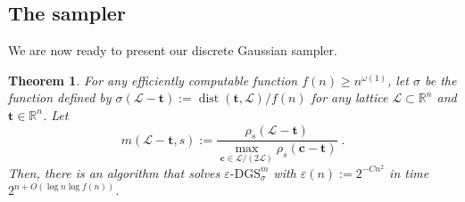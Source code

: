 \documentclass[11pt]{article}
\newtheorem{theorem}{Theorem}[section]
\newcommand{\R}{\ensuremath{\mathbb{R}}}
\newcommand{\eps}{\varepsilon}
\renewcommand{\vec}[1]{\ensuremath{\mathbf{#1}}}
\newcommand{\problem}[1]{\mbox{#1}\xspace}
\newcommand{\DGS}[3]{\ensuremath{#1\text{-}\problem{DGS}_{#2}^{#3}}}
\newcommand{\lat}{\mathcal{L}}
\DeclareMathOperator{\dist}{dist}
\begin{document}
\subsection{The sampler}
We are now ready to present our discrete Gaussian sampler.

\begin{theorem}
\label{thm:DGS}
For any efficiently computable function $f(n)\geq n^{\omega(1)}$, let $\sigma$ be the function defined by $\sigma(\lat - \vec{t}) := \dist(\vec{t}, \lat)/f(n)$ for any lattice $\lat \subset\R^n$ and $\vec{t} \in \R^n$. Let 
\[ 
m(\lat - \vec{t}, s) := \frac{\rho_s(\lat - \vec{t})}{\max_{\vec{c} \in \lat/(2\lat)} \rho_s(\vec{c} - \vec{t})}
\; .
\]
Then, there is an algorithm that solves $\DGS{\eps}{\sigma}{m}$ with $\eps(n) := 2^{-Cn^2}$ in time 
$
2^{n+O(\log n \log f(n))}$.
\end{theorem}
\end{document}
